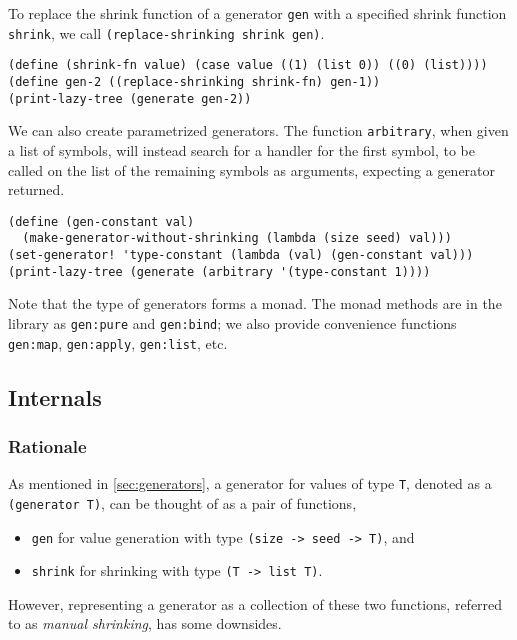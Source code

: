 \documentclass{scrartcl}
\begin{document}
To replace the shrink function of a generator \verb|gen| with a specified shrink
function \verb|shrink|, we call \verb|(replace-shrinking shrink gen)|.

\begin{verbatim}
(define (shrink-fn value) (case value ((1) (list 0)) ((0) (list))))
(define gen-2 ((replace-shrinking shrink-fn) gen-1))
(print-lazy-tree (generate gen-2))
\end{verbatim}

We can also create parametrized generators. The function \verb|arbitrary|, when
given a list of symbols, will instead search for a handler for the first symbol,
to be called on the list of the remaining symbols as arguments, expecting a
generator returned.

\begin{verbatim}
(define (gen-constant val)
  (make-generator-without-shrinking (lambda (size seed) val)))
(set-generator! 'type-constant (lambda (val) (gen-constant val)))
(print-lazy-tree (generate (arbitrary '(type-constant 1))))
\end{verbatim}

Note that the type of generators forms a monad. The monad methods are in the
library as \verb|gen:pure| and \verb|gen:bind|; we also provide convenience
functions \verb|gen:map|, \verb|gen:apply|, \verb|gen:list|, etc.

\subsection{Internals}\label{sec:generator-internals}
\subsubsection{Rationale}
As mentioned in \cref{sec:generators}, a generator for values of type \verb|T|,
denoted as a \verb|(generator T)|,
can be thought of as a pair of functions,
\begin{itemize}
  \item \verb|gen| for value generation
        with type \verb|(size -> seed -> T)|, and
  \item \verb|shrink| for shrinking with type \verb|(T -> list T)|.
\end{itemize}
However, representing a generator as a collection of these two functions,
referred to as \emph{manual shrinking}, has some downsides.
\end{document}
